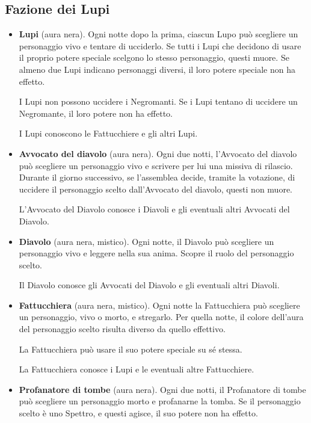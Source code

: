 \documentclass[a4paper,10pt]{article}
\begin{document}
\subsection*{Fazione dei Lupi}

\begin{itemize}
 \item {\bf Lupi} (aura nera). Ogni notte dopo la prima, ciascun Lupo può scegliere un
personaggio vivo e tentare di ucciderlo.
 Se tutti i Lupi che decidono di usare il proprio potere speciale scelgono lo
stesso personaggio, questi muore.
 Se almeno due Lupi indicano personaggi diversi, il loro potere speciale non ha
effetto.
 
 I Lupi non possono uccidere i Negromanti. Se i Lupi tentano di uccidere un
Negromante, il loro potere non ha effetto.
 
 I Lupi conoscono le Fattucchiere e gli altri Lupi.

 \item {\bf Avvocato del diavolo} (aura nera). Ogni due notti, l'Avvocato del
diavolo può scegliere un personaggio vivo e scrivere per lui una missiva di
rilascio.
 Durante il giorno successivo, se l'assemblea decide, tramite la votazione, di
uccidere il personaggio scelto dall'Avvocato del diavolo, questi non muore.
 
 L'Avvocato del Diavolo conosce i Diavoli e gli eventuali altri Avvocati del
Diavolo.

 \item {\bf Diavolo} (aura nera, mistico). Ogni notte, il Diavolo può scegliere
un personaggio vivo e leggere nella sua anima. Scopre il ruolo del personaggio
scelto.
 
 Il Diavolo conosce gli Avvocati del Diavolo e gli eventuali altri Diavoli.
 
 \item {\bf Fattucchiera} (aura nera, mistico). Ogni notte la Fattucchiera può scegliere
un personaggio, vivo o morto, e stregarlo. Per quella notte, il colore dell'aura
del personaggio scelto risulta diverso da quello effettivo.
 
 La Fattucchiera può usare il suo potere speciale su sé stessa.
 
 La Fattucchiera conosce i Lupi e le eventuali altre Fattucchiere.
 
 \item{\bf Profanatore di tombe} (aura nera). Ogni due notti, il Profanatore di tombe
può scegliere un personaggio morto e profanarne la tomba. Se il personaggio scelto è
uno Spettro, e questi agisce, il suo potere non ha effetto.
 

\end{itemize}
\end{document}
